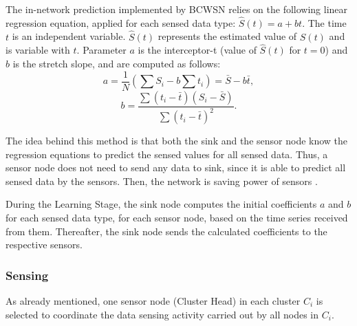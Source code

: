 \documentclass{acm_proc_article-sp}
\begin{document}
The in-network prediction implemented by BCWSN relies on the
following linear regression equation, applied for each sensed data type:
$\hat{S}(t) = a + bt$.
The time $t$ is an independent variable. $\hat{S}(t)$ represents the estimated
value of $S(t)$ and is variable with $t$. Parameter $a$ is the interceptor-t
(value of $\hat{S}(t)$ for $t=0$) and $b$ is the stretch slope, and are computed
as follows:
\begin{equation}
\label{coef-a}
	a = \frac{1}{N}\left(\sum S_{i} - b\sum t_{i} \right) = \bar{S} - b\bar{t},
\end{equation}
\vspace*{-.3cm}
\begin{equation}
\label{coef-b}
	b = \frac{\sum \left(t_{i} - \bar{t}\right)\left(S_{i} - \bar{S}\right)}{\sum \left(t_{i} - \bar{t}\right)^{2}}.
\end{equation}

The idea behind this method is that both the sink and the sensor node know the
regression equations to predict the sensed values for all sensed data. Thus, a
sensor node does not need to send any data to sink, since it is able to predict
all sensed data by the sensors. Then, the network is saving power of sensors
\cite{MaiaACR2013}.

During the Learning Stage, the sink node computes the initial coefficients $a$
and $b$ for each sensed data type, for each sensor node, based on the time
series received from them. Thereafter, the sink node sends the calculated
coefficients to the respective sensors.

 
\subsubsection{Sensing}


As already mentioned, one sensor node (Cluster Head) in each cluster $C_{i}$ is
selected to coordinate the data sensing activity carried out by all nodes in
$C_{i}$.
\end{document}
